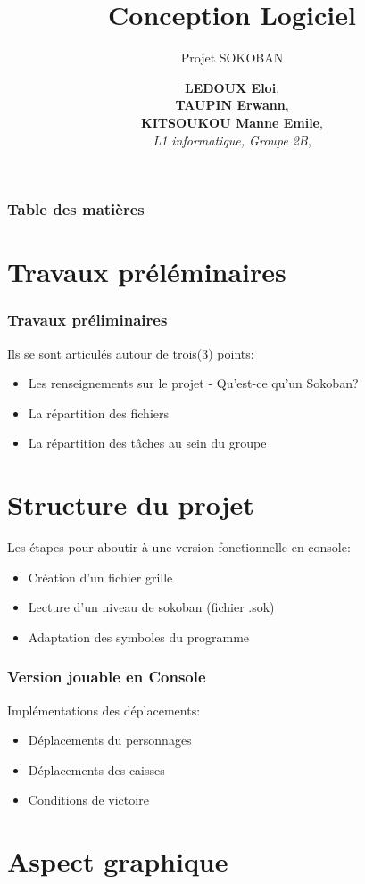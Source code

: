 \documentclass[13pt]{beamer}
\title[Présentation]{\textbf{Conception Logiciel}}
\subtitle[\ldots]{Projet SOKOBAN}
\author[Eloi, Erwann, Emile]{
	\textbf{LEDOUX Eloi},\\
	\textbf{TAUPIN Erwann},\\
	\textbf{KITSOUKOU Manne Emile},\\
	\emph{L1 informatique, Groupe 2B},\\}
\institute[Unicaen]{Université Caen-Normandie}
\begin{document}
\frame{\titlepage}

\begin{frame} %
    \frametitle{Table des matières}
    \tableofcontents
\end{frame}

\section{Travaux préléminaires}
\begin{frame}
    \frametitle{Travaux préliminaires}
    Ils se sont articulés autour de trois(3) points:
    \begin{itemize}
        \item Les renseignements sur le projet - Qu'est-ce qu'un Sokoban?
        \item La répartition des fichiers
        \item La répartition des tâches au sein du groupe
    \end{itemize}
\end{frame}

\section{Structure du projet}

\begin{frame}
    Les étapes pour aboutir à une version fonctionnelle en console:
    \begin{itemize}
        \item Création d'un fichier grille
        \item Lecture d'un niveau de sokoban (fichier .sok)
        \item Adaptation des symboles du programme
    \end{itemize}
\end{frame}
\begin{frame}
    \frametitle{Version jouable en Console}
    Implémentations des déplacements:
    \begin{itemize}
        \item Déplacements du personnages
        \item Déplacements des caisses
        \item Conditions de victoire
    \end{itemize}
\end{frame}

\section{Aspect graphique}
\end{document}
